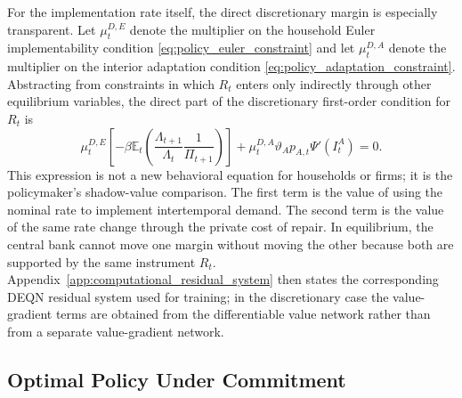 ﻿\documentclass[12pt]{article}
\theoremstyle{remark}
\newcommand{\E}{\mathbb E}
\begin{document}
For the implementation rate itself, the direct discretionary margin is especially transparent. Let
$\mu_t^{D,E}$ denote the multiplier on the household Euler implementability condition
\eqref{eq:policy_euler_constraint} and let $\mu_t^{D,A}$ denote the multiplier on the interior
adaptation condition \eqref{eq:policy_adaptation_constraint}. Abstracting from constraints in which
$R_t$ enters only indirectly through other equilibrium variables, the direct part of the
discretionary first-order condition for $R_t$ is
\begin{equation}
    \mu_t^{D,E}
    \left[
        -\beta
        \E_t
        \left(
            \frac{\Lambda_{t+1}}{\Lambda_t}
            \frac{1}{\Pi_{t+1}}
        \right)
    \right]
    +
    \mu_t^{D,A}
    \vartheta_Ap_{A,t}\Psi'(I_t^A)
    =
    0.
    \label{eq:discretion_R_direct_margin}
\end{equation}
This expression is not a new behavioral equation for households or firms; it is the policymaker's
shadow-value comparison. The first term is the value of using the nominal rate to implement
intertemporal demand. The second term is the value of the same rate change through the private cost
of repair. In equilibrium, the central bank cannot move one margin without moving the other because
both are supported by the same instrument $R_t$. Appendix~\ref{app:computational_residual_system}
then states the corresponding DEQN residual system used for training; in the discretionary case the
value-gradient terms are obtained from the differentiable value network rather than from a separate
value-gradient network.

\subsection{Optimal Policy Under Commitment}
\end{document}
